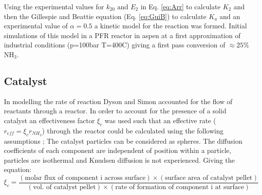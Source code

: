 Using the experimental values for $k_{20}$ and $E_2$ in Eq. \ref{eq:Arr} to calculate $K_2$ and then the Gillespie and Beattie equation (Eq. \ref{eq:GuiB}) to calculate $K_a$ and an experimental value of $\alpha = 0.5$ a kinetic model for the reaction was formed. Initial simulations of this model in a PFR reactor in aspen at a first approximation of industrial conditions (p=100bar T=400\textdegree C) giving a first pass conversion of $\approx25\% $ NH$_3$.

\subsection{Catalyst}

In modelling the rate of reaction Dyson and Simon accounted for the flow of reactants through a reactor. In order to account for the presence of a solid catalyst an effectiveness factor $\xi_{c}$ was used such that an effective rate ($r_{eff}=\xi_{c}r_{NH_3}$) through the reactor could be calculated using the following assumptions \cite{Dyson1968}; The catalyst particles can be considered as spheres. The diffusion coefficients of each component are independent of position within a particle, particles are isothermal and Knudsen diffusion is not experienced. Giving the equation:
\begin{equation}
	\xi_{c} = \frac{(\text{molar flux of component i across surface})\times(\text{surface area of catalyst pellet})}{(\text{vol. of catalyst pellet})\times(\text{rate of formation of component i at surface})}
\end{equation}

